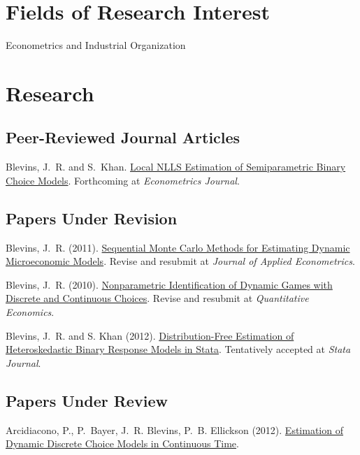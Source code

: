 \documentclass[10pt,letterpaper]{article}
\renewenvironment{itemize}{
  \begin{list}{}{
    \setlength{\leftmargin}{1.5em}
    \setlength{\itemsep}{0.25em}
    \setlength{\parskip}{0pt}
    \setlength{\parsep}{0.25em}
  }
}{
  \end{list}
}
\begin{document}
\section*{Fields of Research Interest}

Econometrics and Industrial Organization

\section*{Research}

\subsection*{Peer-Reviewed Journal Articles}

\begin{itemize}
\item Blevins, J.~R. and S.~Khan.
  \href{http://jblevins.org/research/lnlls}{Local NLLS Estimation of Semiparametric Binary Choice Models}.
  Forthcoming at \textit{Econometrics Journal}.
\end{itemize}

\subsection*{Papers Under Revision}

\begin{itemize}
\item Blevins, J.~R. (2011).
  \href{http://jblevins.org/research/smcdmm}{Sequential Monte Carlo Methods for Estimating Dynamic Microeconomic Models}.
  Revise and resubmit at \textit{Journal of Applied Econometrics}.
\item Blevins, J.~R. (2010).
  \href{http://jblevins.org/research/dcident}{Nonparametric Identification of Dynamic Games with Discrete and Continuous Choices}.
  Revise and resubmit at \textit{Quantitative Economics}.
\item Blevins, J.~R. and S. Khan (2012).
  \href{http://jblevins.org/research/dfbr/}{Distribution-Free Estimation of Heteroskedastic Binary Response Models in Stata}.
  Tentatively accepted at \textit{Stata Journal}.
\end{itemize}

\subsection*{Papers Under Review}

\begin{itemize}
\item Arcidiacono, P., P.~Bayer, J.~R. Blevins, P.~B. Ellickson (2012).
  \href{http://jblevins.org/research/abbe}{Estimation of Dynamic Discrete Choice Models in Continuous Time}.
\end{itemize}
\end{document}
